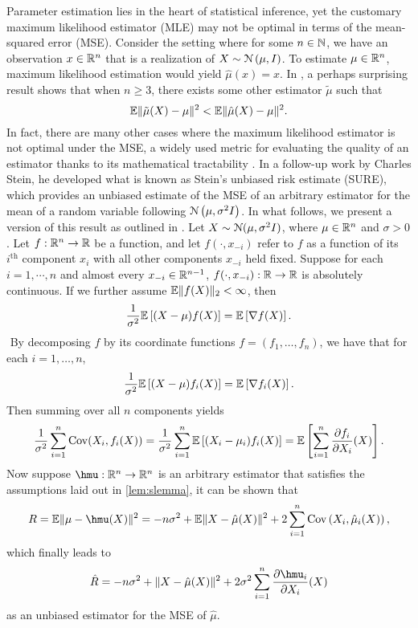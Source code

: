Parameter estimation lies in the heart of statistical inference, yet the customary maximum likelihood estimator (MLE) may not be optimal in terms of the mean-squared error (MSE). Consider the setting where for some $n\in\mathbb{N}$, we have an observation $x\in\mathbb{R}^n$ that is a realization of $X \sim \mathcal{N}\left(\mu, I\right)$. To estimate $\mu\in\mathbb{R}^n$, maximum likelihood estimation would yield $\hat{\mu}(x) = x$. In \citet{stein1956variate}, a perhaps surprising result shows that when $n\geq3$, there exists some other estimator $\tilde{\mu}$ such that
\[
\mathbb{E}\| \tilde{\mu}(X) - \mu \|^2 < \mathbb{E}\| \hat{\mu}(X) - \mu \|^2.
\]
In fact, there are many other cases where the maximum likelihood estimator is not optimal under the MSE, a widely used metric for evaluating the quality of an estimator thanks to its mathematical tractability \citep{berger1975minimax,degroot2005optimal}. In a follow-up work by Charles Stein, he developed what is known as Stein's unbiased risk estimate (SURE), which provides an unbiased estimate of the MSE of an arbitrary estimator for the mean of a random variable following $\mathcal{N}\left(\mu, \sigma^2I\right)$. In what follows, we present a version of this result as outlined in \citet{tibshirani2015stein}.
\blem\label{lem:slemma}
Let $X\sim\mathcal{N}(\mu, \sigma^2I)$, where $\mu\in\mathbb{R}^n$ and $\sigma>0$. Let $f: \mathbb{R}^n\to\mathbb{R}$ be a function, and let $f(\cdot, x_{-i})$ refer to $f$ as a function of its $i^{\text{th}}$ component $x_i$ with all other components $x_{-i}$ held fixed. Suppose for each $i=1,\cdots,n$ and almost every $x_{-i}\in\mathbb{R}^{n-1}$, $f(\cdot, x_{-i}):\mathbb{R}\to\mathbb{R}$ is absolutely continuous. If we further assume $\mathbb{E}\|f(X)\|_2 < \infty$,  then 
\[
\frac{1}{\sigma^2}\mathbb{E}\left[ (X-\mu)f(X) \right] = \mathbb{E}\left[ \nabla f(X) \right].
\]
\elem
$ $\newline
By decomposing $f$ by its coordinate functions $f = (f_1,\dots,f_n)$, we have that for each $i=1,\dots,n$,
\[
\frac{1}{\sigma^2}\mathbb{E}\left[ (X-\mu)f_i(X) \right] = \mathbb{E}\left[ \nabla f_i(X) \right].
\]
Then summing over all $n$ components yields
\[
\frac{1}{\sigma^2}\sum_{i=1}^n\operatorname{Cov}(X_i, f_i(X)) = \frac{1}{\sigma^2}\sum_{i=1}^n \mathbb{E}\left[ (X_i - \mu_i)f_i(X) \right] = \mathbb{E}\left[ \sum_{i=1}^n \frac{\partial f_i}{\partial X_i}(X) \right].
\]
Now suppose $\hmu:\reals^n\to\reals^n$ is an arbitrary estimator that satisfies the assumptions laid out in \cref{lem:slemma}, it can be shown that
\[
R = \EE\| \mu - \hmu(X) \|^2 = -n\sigma^2 + \EE \| X - \hat{\mu}(X) \|^2 + 2\sum_{i=1}^n \cov\left( X_i, \hat{\mu}_i(X) \right),
\]
which finally leads to
\[
\hat{R} = -n\sigma^2 + \| X - \hat{\mu}(X) \|^2 + 2\sigma^2\sum_{i=1}^n \frac{\partial \hmu_i}{\partial X_i}(X)
\]
as an unbiased estimator for the MSE of $\hat{\mu}$.

